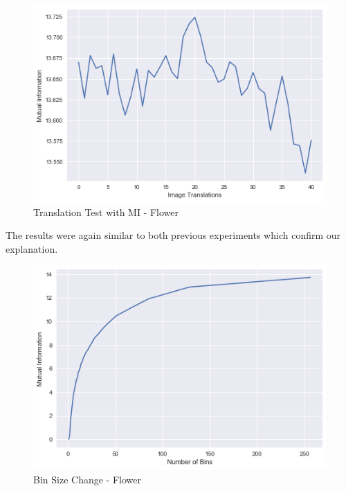 \documentclass{article}
\begin{document}
\begin{figure}[H]
    \centering
    \includegraphics[width=\linewidth]{experiments/flower/flower-translations.png}
    \caption{Translation Test with MI - Flower}
    \label{fig:flower_translations}
\end{figure}

\begin{flushleft}
The results were again similar to both previous experiments which confirm our explanation.
\end{flushleft}

\begin{figure}[H]
    \centering
    \includegraphics[width=\linewidth]{experiments/flower/flower-binSize.png}
    \caption{Bin Size Change - Flower}
    \label{fig:flower_binSize}
\end{figure}
\end{document}
